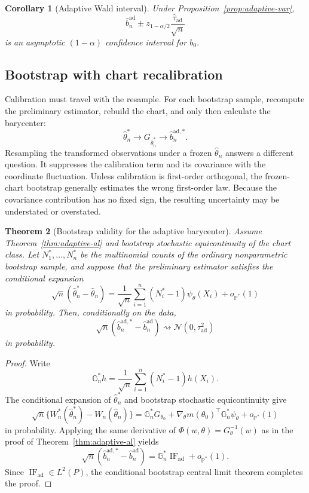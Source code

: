 \documentclass[11pt,a4paper]{article}
\newtheorem{theorem}{Theorem}[section]
\newtheorem{corollary}[theorem]{Corollary}
\theoremstyle{definition}
\newcommand{\Prob}{\mathbb{P}}
\newcommand{\IF}{\operatorname{IF}}
\begin{document}
\begin{corollary}[Adaptive Wald interval]\label{cor:adaptive-wald}
Under Proposition~\ref{prop:adaptive-var},
\[
\widehat b_n^{\mathrm{ad}}
\pm
z_{1-\alpha/2}
\frac{\widehat\tau_{\mathrm{ad}}}{\sqrt n}
\]
is an asymptotic $(1-\alpha)$ confidence interval for $b_0$.
\end{corollary}

\subsection{Bootstrap with chart recalibration}

Calibration must travel with the resample. For each bootstrap sample, recompute the preliminary estimator, rebuild the chart, and only then calculate the barycenter:
\[
\widehat\theta_n^*
\longrightarrow
G_{\widehat\theta_n^*}
\longrightarrow
\widehat b_n^{\mathrm{ad},*}.
\]
Resampling the transformed observations under a frozen $\widehat\theta_n$ answers a different question. It suppresses the calibration term and its covariance with the coordinate fluctuation. Unless calibration is first-order orthogonal, the frozen-chart bootstrap generally estimates the wrong first-order law. Because the covariance contribution has no fixed sign, the resulting uncertainty may be understated or overstated.

\begin{theorem}[Bootstrap validity for the adaptive barycenter]\label{thm:adaptive-bootstrap}
Assume Theorem~\ref{thm:adaptive-al} and bootstrap stochastic equicontinuity of the chart class. Let $N_1^*,\ldots,N_n^*$ be the multinomial counts of the ordinary nonparametric bootstrap sample, and suppose that the preliminary estimator satisfies the conditional expansion
\[
\sqrt n(\widehat\theta_n^*-\widehat\theta_n)
=
\frac1{\sqrt n}\sum_{i=1}^n
(N_i^*-1)\psi_\theta(X_i)
+o_{\Prob^*}(1)
\]
in probability. Then, conditionally on the data,
\[
\sqrt n\left(
\widehat b_n^{\mathrm{ad},*}-\widehat b_n^{\mathrm{ad}}
\right)
\rightsquigarrow
\mathcal N(0,\tau_{\mathrm{ad}}^2)
\]
in probability.
\end{theorem}

\begin{proof}
Write
\[
\mathbb G_n^*h
=
\frac1{\sqrt n}\sum_{i=1}^n(N_i^*-1)h(X_i).
\]
The conditional expansion of $\widehat\theta_n^*$ and bootstrap stochastic equicontinuity give
\[
\sqrt n\{W_n^*(\widehat\theta_n^*)-W_n(\widehat\theta_n)\}
=
\mathbb G_n^*G_{\theta_0}
+\nabla_\theta m(\theta_0)^\top
\mathbb G_n^*\psi_\theta
+o_{\Prob^*}(1)
\]
in probability. Applying the same derivative of $\Phi(w,\theta)=G_\theta^{-1}(w)$ as in the proof of Theorem~\ref{thm:adaptive-al} yields
\[
\sqrt n(\widehat b_n^{\mathrm{ad},*}-\widehat b_n^{\mathrm{ad}})
=
\mathbb G_n^*\IF_{\mathrm{ad}}+o_{\Prob^*}(1).
\]
Since $\IF_{\mathrm{ad}}\in L^2(P)$, the conditional bootstrap central limit theorem completes the proof.
\end{proof}
\end{document}
